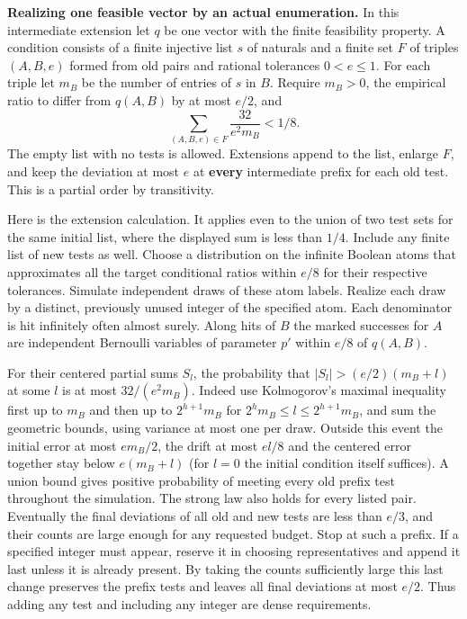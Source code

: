 \documentclass[11pt]{article}
\begin{document}
\textbf{Realizing one feasible vector by an actual enumeration.} In this intermediate extension let \(q\) be one vector with the finite feasibility property. A condition consists of a finite injective list \(s\) of naturals and a finite set \(F\) of triples \((A,B,e)\) formed from old pairs and rational tolerances \(0<e\le1\). For each triple let \(m_B\) be the number of entries of \(s\) in \(B\). Require \(m_B>0\), the empirical ratio to differ from \(q(A,B)\) by at most \(e/2\), and \[\sum_{(A,B,e)\in F}\frac{32}{e^2m_B}<1/8.\] The empty list with no tests is allowed. Extensions append to the list, enlarge \(F\), and keep the deviation at most \(e\) at \textbf{every} intermediate prefix for each old test. This is a partial order by transitivity.

Here is the extension calculation. It applies even to the union of two test sets for the same initial list, where the displayed sum is less than \(1/4\). Include any finite list of new tests as well. Choose a distribution on the infinite Boolean atoms that approximates all the target conditional ratios within \(e/8\) for their respective tolerances. Simulate independent draws of these atom labels. Realize each draw by a distinct, previously unused integer of the specified atom. Each denominator is hit infinitely often almost surely. Along hits of \(B\) the marked successes for \(A\) are independent Bernoulli variables of parameter \(p'\) within \(e/8\) of \(q(A,B)\).

For their centered partial sums \(S_l\), the probability that \(|S_l|>(e/2)(m_B+l)\) at some \(l\) is at most \(32/(e^2m_B)\). Indeed use Kolmogorov's maximal inequality first up to \(m_B\) and then up to \(2^{h+1}m_B\) for \(2^hm_B\le l\le2^{h+1}m_B\), and sum the geometric bounds, using variance at most one per draw. Outside this event the initial error at most \(em_B/2\), the drift at most \(el/8\) and the centered error together stay below \(e(m_B+l)\) (for \(l=0\) the initial condition itself suffices). A union bound gives positive probability of meeting every old prefix test throughout the simulation. The strong law also holds for every listed pair. Eventually the final deviations of all old and new tests are less than \(e/3\), and their counts are large enough for any requested budget. Stop at such a prefix. If a specified integer must appear, reserve it in choosing representatives and append it last unless it is already present. By taking the counts sufficiently large this last change preserves the prefix tests and leaves all final deviations at most \(e/2\). Thus adding any test and including any integer are dense requirements.
\end{document}
